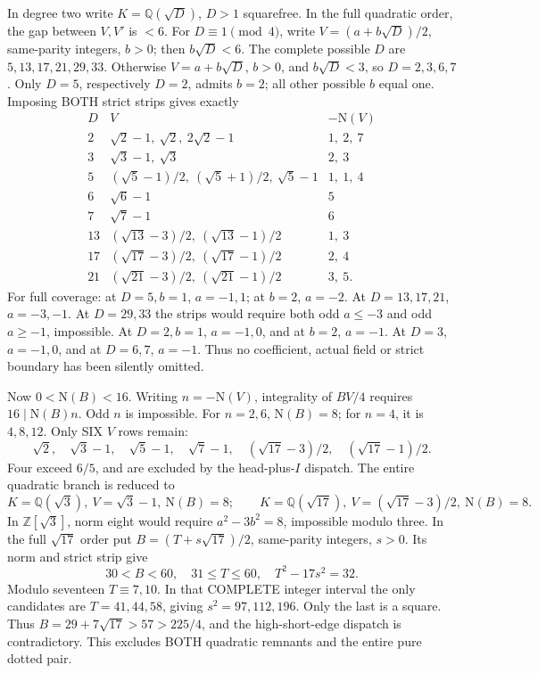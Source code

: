 In degree two write \(K=\mathbb Q(\sqrt D)\),
\(D>1\) squarefree.
In the full quadratic order, the gap between
\(V,V'\) is \(<6\).
For \(D\equiv1\pmod4\), write
\(V=(a+b\sqrt D)/2\), same-parity integers,
\(b>0\); then \(b\sqrt D<6\).
The complete possible \(D\) are \(5,13,17,21,29,33\).
Otherwise \(V=a+b\sqrt D\), \(b>0\), and
\(b\sqrt D<3\), so \(D=2,3,6,7\).
Only \(D=5\), respectively \(D=2\), admits \(b=2\);
all other possible \(b\) equal one.
Imposing BOTH strict strips gives exactly
\[
\begin{array}{c|c|r}
 D&V&-\mathrm N(V)\\ \hline
2&\sqrt2-1,\ \sqrt2,\ 2\sqrt2-1&1,\ 2,\ 7\\
3&\sqrt3-1,\ \sqrt3&2,\ 3\\
5&(\sqrt5-1)/2,\ (\sqrt5+1)/2,\ \sqrt5-1&1,\ 1,\ 4\\
6&\sqrt6-1&5\\
7&\sqrt7-1&6\\
13&(\sqrt{13}-3)/2,\ (\sqrt{13}-1)/2&1,\ 3\\
17&(\sqrt{17}-3)/2,\ (\sqrt{17}-1)/2&2,\ 4\\
21&(\sqrt{21}-3)/2,\ (\sqrt{21}-1)/2&3,\ 5 .
\end{array}
\]
For full coverage: at \(D=5,b=1\), \(a=-1,1\);
at \(b=2\), \(a=-2\).
At \(D=13,17,21\), \(a=-3,-1\).
At \(D=29,33\) the strips would require both
odd \(a\le-3\) and odd \(a\ge-1\), impossible.
At \(D=2,b=1\), \(a=-1,0\), and at \(b=2\),
\(a=-1\).
At \(D=3\), \(a=-1,0\), and at \(D=6,7\),
\(a=-1\).
Thus no coefficient, actual field or strict boundary
has been silently omitted.

Now \(0<\mathrm N(B)<16\).
Writing \(n=-\mathrm N(V)\), integrality of \(BV/4\)
requires \(16\mid\mathrm N(B)n\).
Odd \(n\) is impossible.
For \(n=2,6\), \(\mathrm N(B)=8\);
for \(n=4\), it is \(4,8,12\).
Only SIX \(V\) rows remain:
\[
 \sqrt2,\quad\sqrt3-1,\quad\sqrt5-1,\quad\sqrt7-1,\quad
 (\sqrt{17}-3)/2,\quad(\sqrt{17}-1)/2 .
\]
Four exceed \(6/5\), and are excluded by the
head-plus-\(I\) dispatch.
The entire quadratic branch is reduced to
\[
 K=\mathbb Q(\sqrt3),\ V=\sqrt3-1,\ \mathrm N(B)=8;
 \qquad
 K=\mathbb Q(\sqrt{17}),\
 V=(\sqrt{17}-3)/2,\ \mathrm N(B)=8 .
\]
In \(\mathbb Z[\sqrt3]\), norm eight would require
\(a^2-3b^2=8\), impossible modulo three.
In the full \(\sqrt{17}\) order put
\(B=(T+s\sqrt{17})/2\), same-parity integers, \(s>0\).
Its norm and strict strip give
\[
               30<B<60,\quad31\le T\le60,\quad
               T^2-17s^2=32 .
\]
Modulo seventeen \(T\equiv7,10\).
In that COMPLETE integer interval the only candidates
are \(T=41,44,58\), giving \(s^2=97,112,196\).
Only the last is a square.
Thus \(B=29+7\sqrt{17}>57>225/4\),
and the high-short-edge dispatch is contradictory.
This excludes BOTH quadratic remnants and the entire
pure dotted pair.

